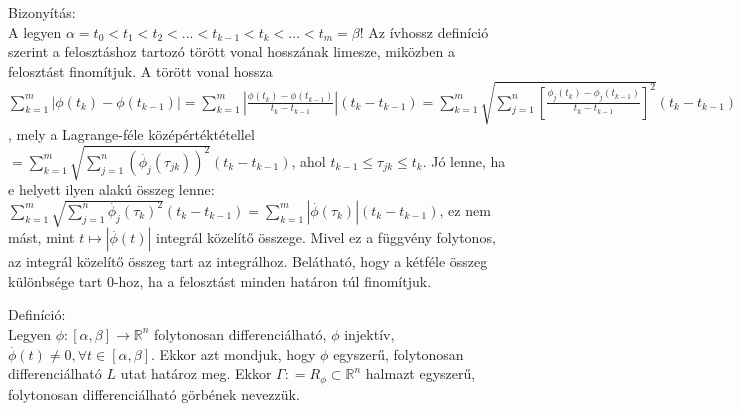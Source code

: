 \documentclass[12pt,a4paper]{scrartcl}
\newenvironment{definicio}{}{}
\newenvironment{bizonyitas}{}{}
\begin{document}
\begin{bizonyitas}

Bizonyítás:\\
A legyen
\(\alpha = t_{0} < t_{1} < t_{2} < ... < t_{k - 1} < t_{k} < ... < t_{m} = \beta\)!
Az ívhossz definíció szerint a felosztáshoz tartozó törött vonal
hosszának limesze, miközben a felosztást finomítjuk. A törött vonal
hossza
\({\sum\limits_{k = 1}^{m}\left| {\phi\left( t_{k} \right) - \phi\left( t_{k - 1} \right)} \right|} = {\sum\limits_{k = 1}^{m}\left| \frac{\phi\left( t_{k} \right) - \phi\left( t_{k - 1} \right)}{t_{k} - t_{k - 1}} \right|}\left( {t_{k} - t_{k - 1}} \right) = {\sum\limits_{k = 1}^{m}\sqrt{\sum\limits_{j = 1}^{n}\left\lbrack \frac{\phi_{j}\left( t_{k} \right) - \phi_{j}\left( t_{k - 1} \right)}{t_{k} - t_{k - 1}} \right\rbrack^{2}}}\left( {t_{k} - t_{k - 1}} \right)\),
mely a Lagrange-féle középértéktétellel
\(= {\sum\limits_{k = 1}^{m}{\sqrt{\sum\limits_{j = 1}^{n}\left( {{\overset{.}{\phi}}_{j}\left( \tau_{jk} \right)} \right)^{2}}\left( {t_{k} - t_{k - 1}} \right)}}\),
ahol \(t_{k - 1} \leq \tau_{jk} \leq t_{k}\). Jó lenne, ha e helyett
ilyen alakú összeg lenne:
\({\sum\limits_{k = 1}^{m}\sqrt{\sum\limits_{j = 1}^{n}{{\overset{.}{\phi}}_{j}\left( \tau_{k} \right)^{2}}}}\left( {t_{k} - t_{k - 1}} \right) = {\sum\limits_{k = 1}^{m}{\left| {\overset{.}{\phi}\left( \tau_{k} \right)} \right|\left( {t_{k} - t_{k - 1}} \right)}}\),
ez nem mást, mint
\(\left. t\mapsto\left| {\overset{.}{\phi}\left( t \right)} \right| \right.\)
integrál közelítő összege. Mivel ez a függvény folytonos, az integrál
közelítő összeg tart az integrálhoz. Belátható, hogy a kétféle összeg
különbsége tart 0-hoz, ha a felosztást minden határon túl finomítjuk.

\end{bizonyitas}

\begin{definicio}

Definíció:\\
Legyen
\(\left. \phi:\left\lbrack {\alpha,\beta} \right\rbrack\rightarrow{\mathbb{R}}^{n} \right.\)
folytonosan differenciálható, \(\phi\) injektív,
\(\overset{.}{\phi}\left( t \right) \neq 0,\forall t \in \left\lbrack {\alpha,\beta} \right\rbrack\).
Ekkor azt mondjuk, hogy \(\phi\) egyszerű, folytonosan differenciálható
\(L\) utat határoz meg. Ekkor
\(\Gamma: = R_{\phi} \subset {\mathbb{R}}^{n}\) halmazt egyszerű,
folytonosan differenciálható görbének nevezzük.

\end{definicio}
\end{document}
